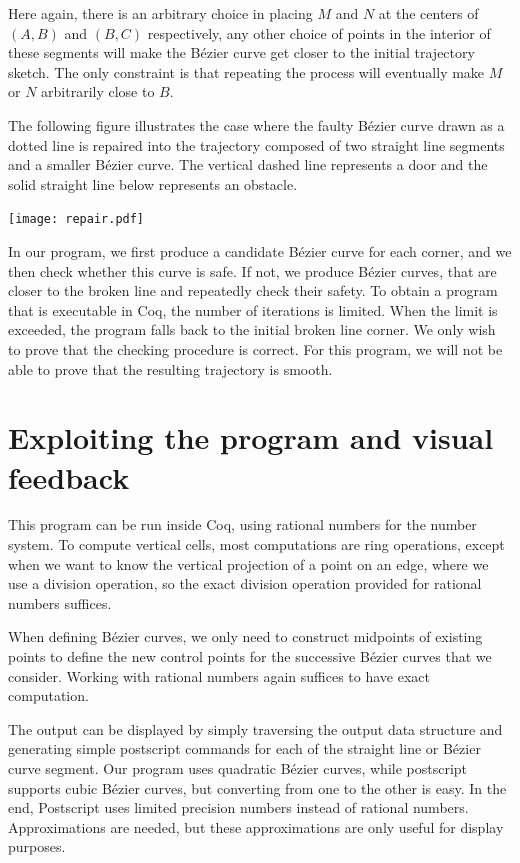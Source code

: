 \documentclass{easychair}
\begin{document}
Here again, there is an arbitrary choice in placing \(M\) and \(N\) at
the centers of \((A,B)\) and \((B,C)\) respectively, any other choice
of points in the interior of these segments will make the Bézier curve
get closer to the initial trajectory sketch.  The only constraint is
that repeating the process will eventually make \(M\) or \(N\)
arbitrarily close to \(B\).

The following figure illustrates the case where the faulty Bézier
curve drawn as a dotted line is repaired into the trajectory composed of two
straight line segments and a smaller Bézier curve.  The vertical
dashed line represents a door and the solid straight line below
represents an obstacle.

\begin{center}
\texttt{[image: repair.pdf]}
\end{center}

In our program, we first produce a candidate Bézier curve for each
corner, and we then check whether this curve is safe.  If not, we
produce Bézier curves, that are closer to the broken line and
repeatedly check their safety.  To obtain a program that is executable
in Coq, the number of iterations is limited.  When the limit is exceeded,
the program falls back to the initial broken line corner.
We only wish to prove that the checking procedure is correct.  For
this program, we will not be able to prove that the resulting trajectory
is smooth.

\section{Exploiting the program and visual feedback}
This program can be run inside Coq, using rational numbers for the
number system.  To compute vertical cells, most computations are ring
operations, except when we want to know the vertical projection of a
point on an edge, where we use a division operation, so the exact
division operation provided for rational numbers suffices.

When defining Bézier curves, we only need to construct midpoints of
existing points to define the new control points for the successive
Bézier curves that we consider.  Working with rational numbers
again suffices to have exact computation.

The output can be displayed by simply traversing the
output data structure and generating simple postscript commands for
each of the straight line or Bézier curve segment.  Our program uses
quadratic Bézier curves, while postscript supports cubic Bézier
curves, but converting from one to the other is easy.  In the end,
Postscript uses limited precision numbers instead of rational numbers.
Approximations are
needed, but these approximations are only useful for display purposes.
\end{document}
